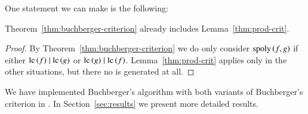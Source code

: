 One statement we can make is the following:

\begin{proposition}
Theorem~\ref{thm:buchberger-criterion} already includes
Lemma~\ref{thm:prod-crit}.
\label{prop:prod-crit-useless}
\end{proposition}

\begin{proof}
By Theorem~\ref{thm:buchberger-criterion} we do only consider $\mathrm{spoly}\left({f},{g}\right)$ if either
$\mathrm{lc}\left({f}\right) \mid \mathrm{lc}\left({g}\right)$ or $\mathrm{lc}\left({g}\right) \mid \mathrm{lc}\left({f}\right)$. Lemma~\ref{thm:prod-crit} applies only
in the other situations, but there no \spt is generated at all.
\end{proof}

We have implemented Buchberger's algorithm with both variants of Buchberger's
criterion in \singular. In Section~\ref{sec:results} we present more detailed
results.
